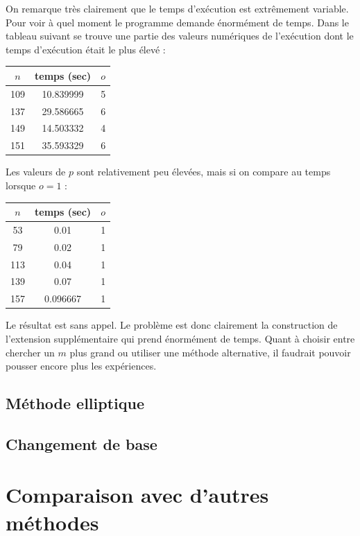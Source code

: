 \documentclass[a4paper]{article} %
\numberwithin{section}{part}
\numberwithin{equation}{section}
\begin{document}
On remarque très clairement que le temps d'exécution est extrêmement variable.
Pour voir à quel moment le programme demande énormément de temps. Dans le
tableau suivant se trouve une partie des valeurs numériques de l'exécution dont
le temps d'exécution était le plus élevé :
\begin{center}
\begin{tabular}{|c|c|c|}
	\hline
	$n$ & temps (sec) & $o$\\
	\hline
	\hline
	109 & 10.839999 & 5\\
	\hline
	137 & 29.586665 & 6\\
	\hline
	149 & 14.503332 & 4\\
	\hline
	151 & 35.593329 & 6\\
	\hline
\end{tabular}
\end{center}
Les valeurs de $p$ sont relativement peu élevées, mais si on compare au temps
lorsque $o = 1$ :
\begin{center}
\begin{tabular}{|c|c|c|}
	\hline
	$n$ & temps (sec) & $o$\\
	\hline
	\hline
	53 & 0.01 & 1\\
	\hline
	79 & 0.02 & 1\\
	\hline
	113 & 0.04 & 1\\
	\hline
	139 & 0.07 & 1\\
	\hline
	157 & 0.096667 & 1\\
	\hline
\end{tabular}
\end{center}
Le résultat est sans appel. Le problème est donc clairement la construction de
l'extension supplémentaire qui prend énormément de temps. Quant à choisir entre
chercher un $m$ plus grand ou utiliser une méthode alternative, il faudrait
pouvoir pousser encore plus les expériences.

\subsection{Méthode elliptique}


\subsection{Changement de base}


\section{Comparaison avec d'autres méthodes}
%
%
%
\end{document}
